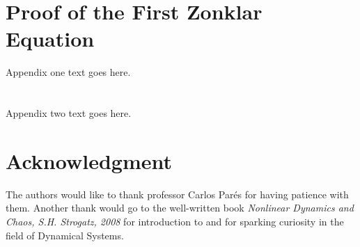 \documentclass[journal]{IEEEtran}
\begin{document}
\appendices
\section{Proof of the First Zonklar Equation}
Appendix one text goes here. 

\section{}
Appendix two text goes here.


\section*{Acknowledgment}
The authors would like to thank professor Carlos Par\'{e}s for having patience with them. Another thank would go to the well-written book \emph{Nonlinear Dynamics and Chaos, S.H. Strogatz, 2008} for introduction to and for sparking curiosity in the field of Dynamical Systems.

  \newpage

\printbibliography



\end{document}
